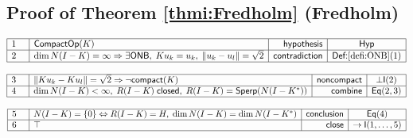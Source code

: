 \documentclass[11pt,reqno]{amsart}
\begin{document}
	\subsection*{Proof of Theorem \protect\ref{thmi:Fredholm} (\textsf{Fredholm})}
	\noindent$\begin{array}{|m{0.5cm}|l|r|c|}
	\hline
	1 & \mathsf{CompactOp}(K) & \mathsf{hypothesis} & \mathsf{Hyp} \\ \hline
	2 & \dim N(I-K)=\infty\Rightarrow\exists\mathsf{ONB},\;Ku_{k}=u_{k},\;\|u_{k}-u_{l}\|=\sqrt2 & \mathsf{contradiction} & \textsf{Def:}\ref{defi:ONB}(1) \\ \hline
	\end{array}$
	\par\nointerlineskip\noindent$\begin{array}{|m{0.5cm}|l|r|c|}
	\hline
	3 & \|Ku_{k}-Ku_{l}\|=\sqrt2\Rightarrow\neg\mathsf{compact}(K) & \mathsf{noncompact} & \bot\mathsf{I}(2) \\ \hline
	4 & \dim N(I-K)<\infty,\;R(I-K)\;\mathsf{closed},\;R(I-K)=\mathsf{Sperp}(N(I-K^{*})) & \mathsf{combine} & \mathsf{Eq}(2,3) \\ \hline
	\end{array}$
	\par\nointerlineskip\noindent$\begin{array}{|m{0.5cm}|l|r|c|}
	\hline
	5 & N(I-K)=\{0\}\Leftrightarrow R(I-K)=H,\;\dim N(I-K)=\dim N(I-K^{*}) & \mathsf{conclusion} & \mathsf{Eq}(4) \\ \hline
	6 & \top & \mathsf{close} & \to\mathsf{I}(1,\dots,5) \\ \hline
	\end{array}$
	\medskip
	
\end{document}
